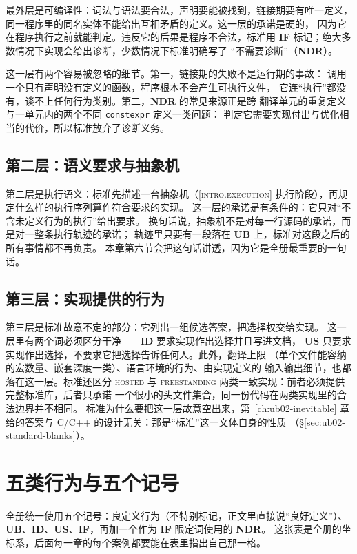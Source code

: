 \documentclass[12pt,a4paper,fontset=fandol]{ctexbook}
\newcommand{\Tp}[1]{\texttt{#1}}
\newcommand{\Lang}[1]{\textsf{#1}}
\newcommand{\CL}{\Lang{C}}
\newcommand{\CPP}{\Lang{C++}}
\newcommand{\UB}{\textbf{\textsf{UB}}}
\newcommand{\IDB}{\textbf{\textsf{ID}}}
\newcommand{\USB}{\textbf{\textsf{US}}}
\newcommand{\NDR}{\textbf{\textsf{NDR}}}
\newcommand{\ILLF}{\textbf{\textsf{IF}}}
\newcommand{\Std}[1]{\textsc{[#1]}}
\newcommand{\Clause}[1]{\textsc{\small #1}}
\begin{document}
最外层是可编译性：词法与语法要合法，声明要能被找到，链接期要有唯一定义，
同一程序里的同名实体不能给出互相矛盾的定义。这一层的承诺是硬的，
因为它在程序执行之前就能判定。违反它的后果是程序不合法，标准用
\ILLF{} 标记；绝大多数情况下实现会给出诊断，少数情况下标准明确写了
“不需要诊断”（\NDR{}）。

这一层有两个容易被忽略的细节。第一，链接期的失败不是运行期的事故：
调用一个只有声明没有定义的函数，程序根本不会产生可执行文件，
它连“执行”都没有，谈不上任何行为类别。第二，\NDR{} 的常见来源正是跨
翻译单元的重复定义与一单元内的两个不同 \Tp{constexpr} 定义一类问题：
判定它需要实现付出与优化相当的代价，所以标准放弃了诊断义务。

\subsection{第二层：语义要求与抽象机}\label{sec:ub01-layer-semantics}

第二层是执行语义：标准先描述一台抽象机（\Std{intro.execution}
\Clause{执行阶段}），再规定什么样的执行序列算作符合要求的实现。
这一层的承诺是有条件的：它只对“不含未定义行为的执行”给出要求。
换句话说，抽象机不是对每一行源码的承诺，而是对一整条执行轨迹的承诺；
轨迹里只要有一段落在 \UB{} 上，标准对这段之后的所有事情都不再负责。
本章第六节会把这句话讲透，因为它是全册最重要的一句话。

\subsection{第三层：实现提供的行为}\label{sec:ub01-layer-impl}

第三层是标准故意不定的部分：它列出一组候选答案，把选择权交给实现。
这一层里有两个词必须区分干净——\IDB{} 要求实现作出选择并且写进文档，
\USB{} 只要求实现作出选择，不要求它把选择告诉任何人。此外，翻译上限
（单个文件能容纳的宏数量、嵌套深度一类）、语言环境的行为、由实现定义的
输入输出细节，也都落在这一层。标准还区分 \Clause{hosted} 与
\Clause{freestanding} 两类一致实现：前者必须提供完整标准库，后者只承诺
一个很小的头文件集合，同一份代码在两类实现里的合法边界并不相同。
标准为什么要把这一层故意空出来，第~\ref{ch:ub02-inevitable} 章给的答案与
\CL{}/\CPP{} 的设计无关：那是“标准”这一文体自身的性质
（\S\ref{sec:ub02-standard-blanks}）。

\section{五类行为与五个记号}\label{sec:ub01-five-kinds}

全册统一使用五个记号：良定义行为（不特别标记，正文里直接说“良好定义”）、
\UB{}、\IDB{}、\USB{}、\ILLF{}，再加一个作为 \ILLF{} 限定词使用的 \NDR{}。
这张表是全册的坐标系，后面每一章的每个案例都要能在表里指出自己那一格。
\end{document}
